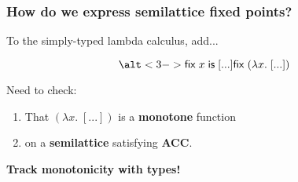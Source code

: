 \documentclass{beamer}
\newcommand{\ms}{\mathsf}
\begin{document}

\begin{frame}
  \frametitle{How do we express semilattice fixed points?}

  To the simply-typed lambda calculus, add...\pause

  {\huge\[ \alt<3->{\ms{fix}\;x\;\ms{is}\;[...]}
                   {\ms{fix}\;(\lambda x.\; [...])} \]}\pause\pause

  Need to check:
  \begin{enumerate}
  \item That $(\lambda x.\; [...])$ is a \textbf{monotone} function
  \item \color{gray} on a \textbf{semilattice} satisfying \textbf{ACC}.
  \end{enumerate}

\end{frame}

\begin{frame}
  \begin{center}
    \huge\bf Track monotonicity with types!
  \end{center}
\end{frame}
\end{document}
